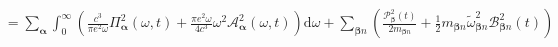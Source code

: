 \documentclass{article}
\begin{document}
\begin{equation}
\begin{split}
&= \sum_{\bm{\alpha}}\int_0^\infty\left(\frac{c^3}{\pi e^2\omega}\mathit{\Pi}_{\bm{\alpha}}^2(\omega,t) + \frac{\pi e^2\omega}{4c^3}\omega^2\mathcal{A}_{\bm{\alpha}}^2(\omega,t)\right)\mathrm{d}\omega + \sum_{\bm{\beta}n}\left(\frac{\mathcal{P}_{\bm{\beta}}^2(t)}{2m_{\bm{\beta}n}} + \frac{1}{2}m_{\bm{\beta}n}\tilde{\omega}_{\bm{\beta}n}^2\mathcal{B}_{\bm{\beta}n}^2(t)\right)\\

\end{split}
\end{equation}
\end{document}
